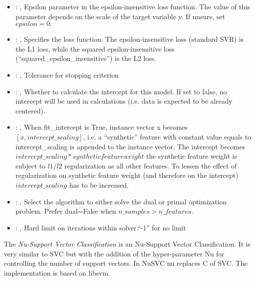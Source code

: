 \begin{itemize}
    \item {}: , 
      Epsilon parameter in the epsilon-insensitive loss function. The value of
      this parameter depends on the scale of the target variable y. If unsure, set $epsilon=0.$

    \item {}: , 
      Specifies the loss function. The epsilon-insensitive loss (standard SVR)
      is the L1 loss, while the squared epsilon-insensitive loss (``squared\_epsilon\_insensitive'')
      is the L2 loss.

    \item {}: , 
      Tolerance for stopping criterion

    \item {}: , 
      Whether to calculate the intercept for this model. If set to false, no
      intercept will be used in calculations (i.e. data is expected to be already centered).

    \item {}: , 
      When fit\_intercept is True, instance vector x becomes $[x, intercept\_scaling]$,
      i.e. a “synthetic” feature with constant value equals to intercept\_scaling is appended
      to the instance vector. The intercept becomes $intercept\_scaling * synthetic feature weight$
      \nb the synthetic feature weight is subject to $l1/l2$ regularization as all other features.
      To lessen the effect of regularization on synthetic feature weight (and therefore on the
      intercept)                                                  $intercept\_scaling$ has to be
      increased.

    \item {}: , 
      Select the algorithm to either solve the dual or primal optimization problem.
      Prefer dual=False when $n\_samples > n\_features$.

    \item {}: , 
      Hard limit on iterations within solver.``-1'' for no limit
  \end{itemize}
 The  \textit{Nu-Support Vector Classification} is an Nu-Support Vector
 Classification.                             It is very similar to SVC but with the addition of the
 hyper-parameter Nu for controlling the                             number of support vectors. In
 NuSVC nu replaces C of SVC.                             The implementation is based on libsvm.

